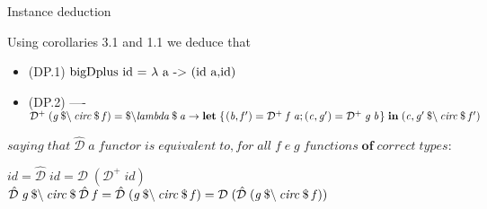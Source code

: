 \documentclass{beamer}
\newcommand{\Varid}[1]{\mathit{#1}}
\begin{document}
\begin{frame}{Instance deduction}

Using corollaries 3.1 and 1.1 we deduce that

\begin{itemize}
    \item (DP.1) \ensuremath{\mbox{\onelinecomment  bigDplus id = $\lambda$ a -> (id a,id)}}
    \item (DP.2) ----    
    \ensuremath{\mathcal{D}^{+}\;(\Varid{g}\mathbin{\$\char92 }\Varid{circ}\mathbin{\$}\Varid{f})\mathrel{=}\mathbin{\$\char92 }\Varid{lambda}\mathbin{\$}\Varid{a}\rightarrow \mathbf{let}\;\{\mskip1.5mu (\Varid{b},\Varid{f'})\mathrel{=}\mathcal{D}^{+}\;\Varid{f}\;\Varid{a};(\Varid{c},\Varid{g'})\mathrel{=}\mathcal{D}^{+}\;\Varid{g}\;\Varid{b}\mskip1.5mu\}\;\mathbf{in}\;(\Varid{c},\Varid{g'}\mathbin{\$\char92 }\Varid{circ}\mathbin{\$}\Varid{f'})}   
\end{itemize}
\ensuremath{\Varid{saying}\;\Varid{that}\;\mathcal{\hat{D}}\;\Varid{a}\;\Varid{functor}\;\Varid{is}\;\Varid{equivalent}\;\Varid{to},\Varid{for}\;\Varid{all}\;\Varid{f}\;\Varid{e}\;\Varid{g}\;\Varid{functions}\;\mathbf{of}\;\Varid{correct}\;\Varid{types}\mathbin{:}}

    \ensuremath{\Varid{id}\mathrel{=}\mathcal{\hat{D}}\;\Varid{id}\mathrel{=}\mathcal{D}\;(\mathcal{D}^{+}\;\Varid{id})}
    \ensuremath{\mathcal{\hat{D}}\;\Varid{g}\mathbin{\$\char92 }\Varid{circ}\mathbin{\$}\mathcal{\hat{D}}\;\Varid{f}\mathrel{=}\mathcal{\hat{D}}\;(\Varid{g}\mathbin{\$\char92 }\Varid{circ}\mathbin{\$}\Varid{f})\mathrel{=}\mathcal{D}\;(\mathcal{\hat{D}}\;(\Varid{g}\mathbin{\$\char92 }\Varid{circ}\mathbin{\$}\Varid{f}))}


\end{frame}
\end{document}
